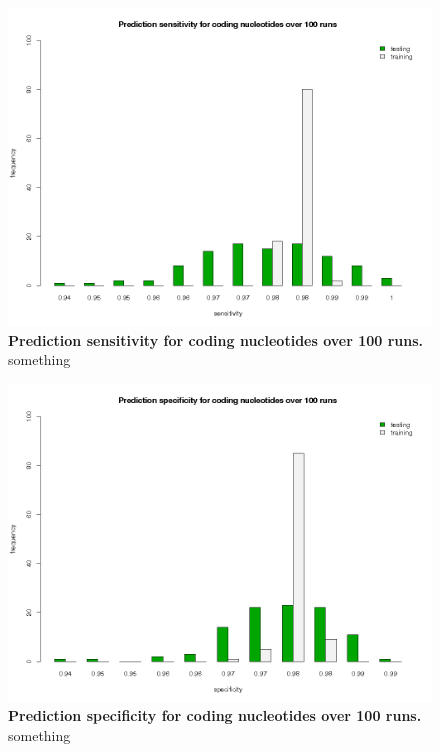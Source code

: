 \begin{figure}[ht]
	\begin{center}
		\includegraphics[scale=0.42]{pics/codingNucleotides_sens.png}
	\caption[Prediction sensitivity for coding nucleotides over 100 runs]{
	\textbf{Prediction sensitivity for coding nucleotides over 100 runs.}
	something}
	\end{center}
	\label{fig:codingNucleotides_sens}
\end{figure}

\begin{figure}[ht]
	\begin{center}
		\includegraphics[scale=0.42]{pics/codingNucleotides_spec.png}
	\caption[Prediction specificity for coding nucleotides over 100 runs]{
	\textbf{Prediction specificity for coding nucleotides over 100 runs.}
	something}
	\end{center}
	\label{fig:codingNucleotides_spec}
\end{figure}

